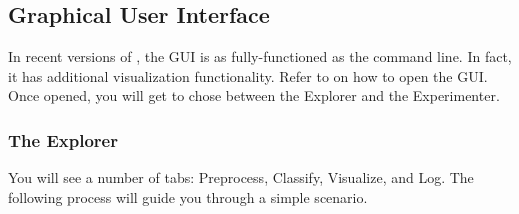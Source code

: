 \documentclass[11pt]{article}
\newcommand{\MEKA}{Meka}
\begin{document}
\subsection{Graphical User Interface}

In recent versions of \framework{\MEKA}, the GUI is as fully-functioned as the command line. In fact, it has additional visualization functionality. Refer to  on how to open the GUI. Once opened, you will get to chose between the \textsf{Explorer} and the \textsf{Experimenter}. 

\subsubsection{The Explorer}

You will see a number of tabs: \textsf{Preprocess}, \textsf{Classify}, \textsf{Visualize}, and \textsf{Log}. The following process will guide you through a simple scenario.
\end{document}
